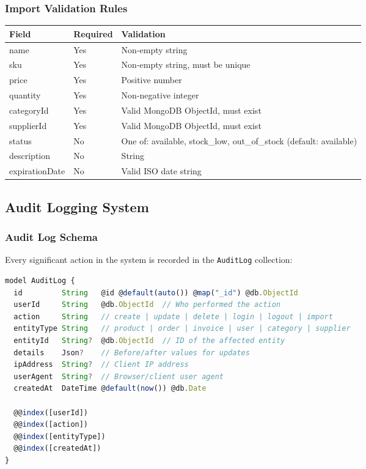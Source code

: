 \documentclass[12pt,onecolumn]{IEEEtran}
\begin{document}
\subsubsection{Import Validation Rules}

\begin{center}
\begin{tabularx}{\textwidth}{llX}
  \toprule
  \textbf{Field} & \textbf{Required} & \textbf{Validation} \\
  \midrule
  name       & Yes & Non-empty string \\
  sku        & Yes & Non-empty string, must be unique \\
  price      & Yes & Positive number \\
  quantity   & Yes & Non-negative integer \\
  categoryId & Yes & Valid MongoDB ObjectId, must exist \\
  supplierId & Yes & Valid MongoDB ObjectId, must exist \\
  status     & No  & One of: available, stock\_low, out\_of\_stock (default: available) \\
  description & No & String \\
  expirationDate & No & Valid ISO date string \\
  \bottomrule
\end{tabularx}
\end{center}

\subsection{Audit Logging System}

\subsubsection{Audit Log Schema}

Every significant action in the system is recorded in the \texttt{AuditLog} collection:

\begin{lstlisting}[language=JavaScript,caption={AuditLog model}]
model AuditLog {
  id         String   @id @default(auto()) @map("_id") @db.ObjectId
  userId     String   @db.ObjectId  // Who performed the action
  action     String   // create | update | delete | login | logout | import
  entityType String   // product | order | invoice | user | category | supplier
  entityId   String?  @db.ObjectId  // ID of the affected entity
  details    Json?    // Before/after values for updates
  ipAddress  String?  // Client IP address
  userAgent  String?  // Browser/client user agent
  createdAt  DateTime @default(now()) @db.Date

  @@index([userId])
  @@index([action])
  @@index([entityType])
  @@index([createdAt])
}
\end{lstlisting}
\end{document}
